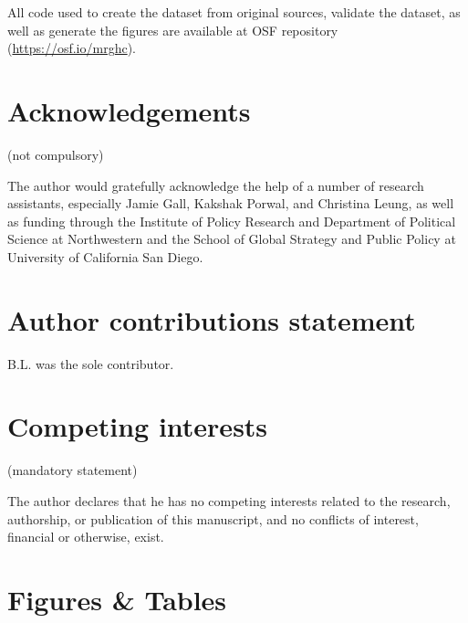 \documentclass[fleqn,10pt]{wlscirep}
\begin{document}
All code used to create the dataset from original sources, validate the dataset, as well as generate the figures are available at OSF repository (\url{https://osf.io/mrghc}).



\section*{Acknowledgements} (not compulsory)


The author would gratefully acknowledge the help of a number of research assistants, especially Jamie Gall, Kakshak Porwal, and Christina Leung, as well as funding through the Institute of Policy Research and Department of Political Science at Northwestern and the School of Global Strategy and Public Policy at University of California San Diego. 

\section*{Author contributions statement}

B.L. was the sole contributor.

\section*{Competing interests} (mandatory statement)

The author declares that he has no competing interests related to the research, authorship, or publication of this manuscript, and no conflicts of interest, financial or otherwise, exist.

\section*{Figures \& Tables}
\end{document}
